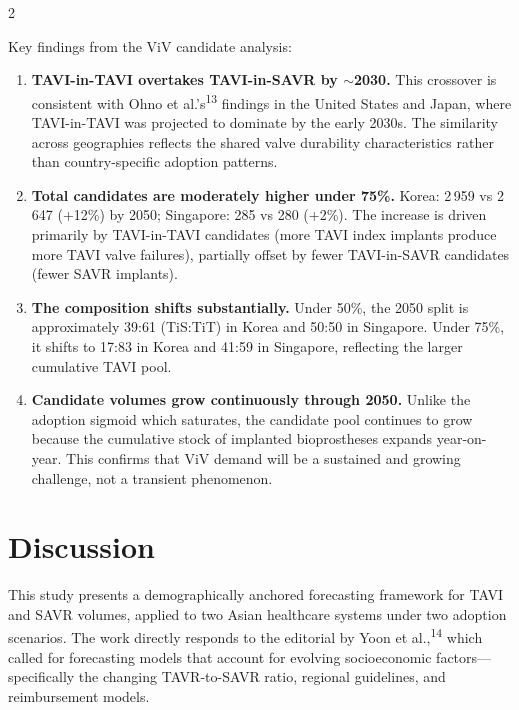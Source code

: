 \documentclass[10pt, a4paper]{article}
\begin{document}
\begin{multicols}{2}

Key findings from the ViV candidate analysis:

\begin{enumerate}[leftmargin=*, itemsep=4pt]
    \item \textbf{TAVI-in-TAVI overtakes TAVI-in-SAVR by $\sim$2030.} This crossover is consistent with Ohno et al.'s\textsuperscript{13} findings in the United States and Japan, where TAVI-in-TAVI was projected to dominate by the early 2030s. The similarity across geographies reflects the shared valve durability characteristics rather than country-specific adoption patterns.

    \item \textbf{Total candidates are moderately higher under 75\%.} Korea: 2\,959 vs 2\,647 (+12\%) by 2050; Singapore: 285 vs 280 (+2\%). The increase is driven primarily by TAVI-in-TAVI candidates (more TAVI index implants produce more TAVI valve failures), partially offset by fewer TAVI-in-SAVR candidates (fewer SAVR implants).

    \item \textbf{The composition shifts substantially.} Under 50\%, the 2050 split is approximately 39:61 (TiS:TiT) in Korea and 50:50 in Singapore. Under 75\%, it shifts to 17:83 in Korea and 41:59 in Singapore, reflecting the larger cumulative TAVI pool.

    \item \textbf{Candidate volumes grow continuously through 2050.} Unlike the adoption sigmoid which saturates, the candidate pool continues to grow because the cumulative stock of implanted bioprostheses expands year-on-year. This confirms that ViV demand will be a sustained and growing challenge, not a transient phenomenon.
\end{enumerate}


\section{Discussion}

This study presents a demographically anchored forecasting framework for TAVI and SAVR volumes, applied to two Asian healthcare systems under two adoption scenarios. The work directly responds to the editorial by Yoon et al.,\textsuperscript{14} which called for forecasting models that account for evolving socioeconomic factors---specifically the changing TAVR-to-SAVR ratio, regional guidelines, and reimbursement models.


\end{multicols}
\end{document}
